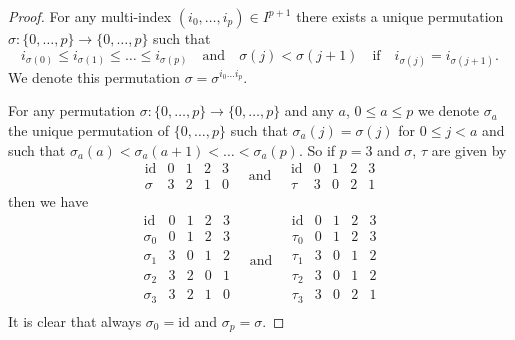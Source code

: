 \begin{proof}

For any multi-index $(i_0, \ldots, i_p) \in I^{p + 1}$ there exists
a unique permutation $\sigma : \{0, \ldots, p\} \to \{0, \ldots, p\}$
such that
$$
i_{\sigma(0)} \leq i_{\sigma(1)} \leq \ldots \leq i_{\sigma(p)}
\quad
\text{and}
\quad
\sigma(j) < \sigma(j + 1)
\quad
\text{if}
\quad
i_{\sigma(j)} = i_{\sigma(j + 1)}.
$$
We denote this permutation $\sigma = \sigma^{i_0 \ldots i_p}$.

\medskip\noindent
For any permutation $\sigma : \{0, \ldots, p\} \to \{0, \ldots, p\}$
and any $a$, $0 \leq a \leq p$ we denote $\sigma_a$
the unique permutation of $\{0, \ldots, p\}$ such that
$\sigma_a(j) = \sigma(j)$ for $0 \leq j < a$ and such that
$\sigma_a(a) < \sigma_a(a + 1) < \ldots < \sigma_a(p)$.
So if $p = 3$ and $\sigma$, $\tau$ are given by
$$
\begin{matrix}
\text{id} & 0 & 1 & 2 & 3 \\
\sigma & 3 & 2 & 1 & 0
\end{matrix}
\quad \text{and} \quad
\begin{matrix}
\text{id} & 0 & 1 & 2 & 3 \\
\tau & 3 & 0 & 2 & 1
\end{matrix}
$$
then we have
$$
\begin{matrix}
\text{id} & 0 & 1 & 2 & 3 \\
\sigma_0 & 0 & 1 & 2 & 3 \\
\sigma_1 & 3 & 0 & 1 & 2 \\
\sigma_2 & 3 & 2 & 0 & 1 \\
\sigma_3 & 3 & 2 & 1 & 0 \\
\end{matrix}
\quad \text{and} \quad
\begin{matrix}
\text{id} & 0 & 1 & 2 & 3 \\
\tau_0 & 0 & 1 & 2 & 3 \\
\tau_1 & 3 & 0 & 1 & 2 \\
\tau_2 & 3 & 0 & 1 & 2 \\
\tau_3 & 3 & 0 & 2 & 1 \\
\end{matrix}
$$
It is clear that always $\sigma_0 = \text{id}$ and $\sigma_p = \sigma$.


\end{proof}
